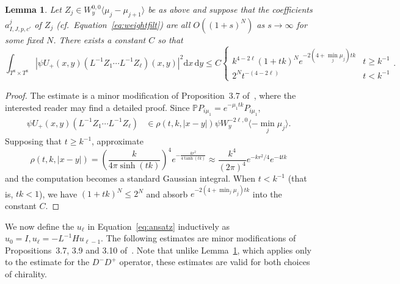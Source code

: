 \documentclass{article}
\newcommand{\di}{\mathrm{d}}
\newcommand{\proj}{\mathbb{P}}
\newcommand{\inv}{^{-1}}
\newtheorem{lemma}[theorem]{Lemma}
\theoremstyle{definition}
\theoremstyle{remark}
\begin{document}
\begin{lemma}
    \label{lem:mineigen}
    Let $Z_j \in W^{0,0}_y \langle \mu_j - \mu_{j+1} \rangle$ be as above and suppose that the coefficients $a^j_{I,J,p,c'}$ of $Z_j$ (cf.~Equation~\eqref{eq:weightfilt}) are all $O((1+s)^N)$ as $s \to \infty$ for some fixed $N$.
    There exists a constant $C$ so that 
    \[
        \int_{T^8 \times T^8} | \psi U_+(x,y) (L\inv Z_1 \cdots L\inv Z_\ell)(x,y)|^2 \di x\, \di y \le C \begin{cases} k^{4-2\ell} (1+tk)^N e^{-2(4+\min_j \mu_j) tk} & t \ge k\inv \\ 2^N t^{-(4-2\ell)} & t < k\inv \end{cases}.
    \]
\end{lemma}
\begin{proof}
    The estimate is a minor modification of Proposition~3.7 of~\cite{charbonneauAsymptoticHodgeTheory2015}, where the interested reader may find a detailed proof.
    Since $\proj P_{i\mu_1} = e^{-\mu_1 tk} P_{i\mu_1}$,
    \begin{align*}
        \psi U_+(x,y) (L\inv Z_1 \cdots L\inv Z_\ell) &\in \rho(t,k,|x-y|) \psi W^{-2\ell,0}_y \langle -\min_j \mu_j \rangle. 
    \end{align*}
    Supposing that $t \ge k\inv$, approximate
    \[
        \rho(t,k,|x-y|) = \left(\frac{k}{4\pi\sinh(tk)}\right)^4 e^{-\frac{kr^2}{4\tanh(tk)}} \approx \frac{k^4}{(2\pi)^4}e^{-kr^2/4} e^{-4tk}
    \]
    and the computation becomes a standard Gaussian integral.
    When $t < k\inv$ (that is, $tk < 1$), we have $(1 + tk)^N \le 2^N$ and absorb $e^{-2(4+\min_j \mu_j) tk}$ into the constant $C$.
\end{proof}

We now define the $u_\ell$ in Equation~\eqref{eq:ansatz} inductively as $u_0 = I, u_\ell = -L\inv H u_{\ell-1}$.
The following estimates are minor modifications of Propositions~3.7, 3.9 and 3.10 of~\cite{charbonneauAsymptoticHodgeTheory2015}.
Note that unlike Lemma~\ref{lem:mineigen}, which applies only to the estimate for the $D^- D^+$ operator, these estimates are valid for both choices of chirality.
\end{document}
